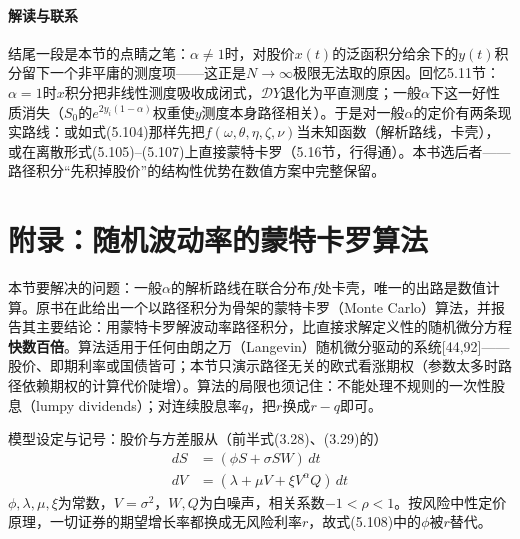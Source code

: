 \paragraph{解读与联系}
结尾一段是本节的点睛之笔：$\alpha\neq1$时，对股价$x(t)$的泛函积分给余下的$y(t)$积分留下一个非平庸的测度项——这正是$N\to\infty$极限无法取的原因。回忆5.11节：$\alpha=1$时$x$积分把非线性测度吸收成闭式，$\mathcal{D}Y$退化为平直测度；一般$\alpha$下这一好性质消失（$S_0$的$e^{2y_i(1-\alpha)}$权重使$y$测度本身路径相关）。于是对一般$\alpha$的定价有两条现实路线：或如式(5.104)那样先把$f(\omega,\theta,\eta,\zeta,\nu)$当未知函数（解析路线，卡壳），或在离散形式(5.105)--(5.107)上直接蒙特卡罗（5.16节，行得通）。本书选后者——路径积分“先积掉股价”的结构性优势在数值方案中完整保留。

\section{附录：随机波动率的蒙特卡罗算法}

本节要解决的问题：一般$\alpha$的解析路线在联合分布$f$处卡壳，唯一的出路是数值计算。原书在此给出一个以路径积分为骨架的蒙特卡罗（Monte Carlo）算法，并报告其主要结论：用蒙特卡罗解波动率路径积分，比直接求解定义性的随机微分方程\textbf{快数百倍}。算法适用于任何由朗之万（Langevin）随机微分驱动的系统[44,92]——股价、即期利率或国债皆可；本节只演示路径无关的欧式看涨期权（参数太多时路径依赖期权的计算代价陡增）。算法的局限也须记住：不能处理不规则的一次性股息（lumpy dividends）；对连续股息率$q$，把$r$换成$r-q$即可。

模型设定与记号：股价与方差服从（前半式(3.28)、(3.29)的）
\begin{align*}
dS&=(\phi S+\sigma SW)\,dt
\tag{5.108}\\
dV&=(\lambda+\mu V+\xi V^{\alpha}Q)\,dt
\tag{5.109}
\end{align*}
$\phi,\lambda,\mu,\xi$为常数，$V=\sigma^{2}$，$W,Q$为白噪声，相关系数$-1<\rho<1$。按风险中性定价原理，一切证券的期望增长率都换成无风险利率$r$，故式(5.108)中的$\phi$被$r$替代。

